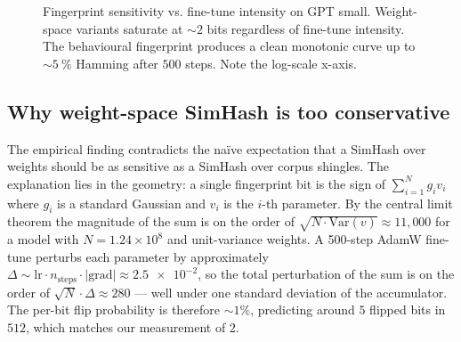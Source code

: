 \documentclass[11pt,a4paper]{article}
\begin{document}
\begin{figure}[h]
  \centering
  \caption{Fingerprint sensitivity vs. fine\nobreakdash-tune intensity
    on GPT small.  Weight\nobreakdash-space variants
    saturate at $\sim\!2$ bits regardless of fine\nobreakdash-tune
    intensity.  The behavioural fingerprint produces a clean
    monotonic curve up to $\sim\!\SI{5}{\percent}$ Hamming after
    $500$ steps.  Note the log\nobreakdash-scale x\nobreakdash-axis.}
  \label{fig:model:sensitivity}
\end{figure}

\subsection{Why weight-space SimHash is too conservative}
\label{sec:weight-too-conservative}

The empirical finding contradicts the naïve expectation that a
SimHash over weights should be as sensitive as a SimHash over
corpus shingles.  The explanation lies in the geometry: a single
fingerprint bit is the sign of $\sum_{i=1}^{N} g_i v_i$ where $g_i$
is a standard Gaussian and $v_i$ is the $i$\nobreakdash-th parameter.  By
the central limit theorem the magnitude of the sum is on the order
of $\sqrt{N \cdot \mathrm{Var}(v)} \approx 11{,}000$ for a model
with $N = 1.24 \times 10^{8}$ and unit\nobreakdash-variance weights.
A 500\nobreakdash-step AdamW fine\nobreakdash-tune perturbs each
parameter by approximately $\Delta \sim \mathrm{lr} \cdot
n_\mathrm{steps} \cdot |\mathrm{grad}| \approx \num{2.5e-2}$, so the
total perturbation of the sum is on the order of $\sqrt{N} \cdot
\Delta \approx 280$ — well under one standard deviation of the
accumulator.  The per\nobreakdash-bit flip probability is therefore
$\sim 1\%$, predicting around $5$ flipped bits in $512$, which
matches our measurement of $2$.
\end{document}
